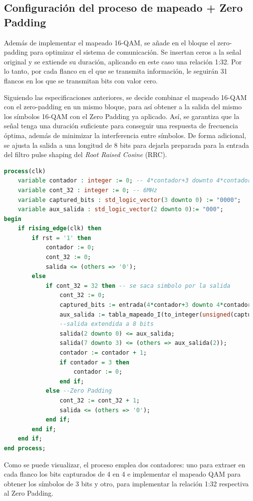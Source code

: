 \subsection{Configuración del proceso de mapeado + Zero Padding}

Además de implementar el mapeado 16-QAM, se añade en el bloque el zero-padding para optimizar el sistema de comunicación. Se insertan ceros a la señal original y se extiende su duración, aplicando en este caso una relación 1:32. Por lo tanto, por cada flanco en el que se transmita información, le seguirán 31 flancos en los que se transmitan bits con valor cero.

Siguiendo las especificaciones anteriores, se decide combinar el mapeado 16-QAM con el zero-padding en un mismo bloque, para así obtener a la salida del mismo los símbolos 16-QAM con el Zero Padding ya aplicado. Así, se garantiza que la señal tenga una duración suficiente para conseguir una respuesta de frecuencia óptima, además de minimizar la interferencia entre símbolos. De forma adicional, se ajusta la salida a una longitud de 8 bits para dejarla preparada para la entrada del filtro pulse shaping del \textit{Root Raised Cosine} (RRC). 

\vspace{3mm}

\begin{lstlisting}[language=VHDL, style=mystyle, caption={Proceso de mapeado (Camino I) + Zero Padding}]
process(clk) 
	variable contador : integer := 0; -- 4*contador+3 downto 4*contador
	variable cont_32 : integer := 0; -- 6MHz
	variable captured_bits : std_logic_vector(3 downto 0) := "0000";
	variable aux_salida : std_logic_vector(2 downto 0):= "000";
begin
	if rising_edge(clk) then
		if rst = '1' then
			contador := 0; 
			cont_32 := 0; 
			salida <= (others => '0'); 
		else
			if cont_32 = 32 then -- se saca simbolo por la salida
				cont_32 := 0;
				captured_bits := entrada(4*contador+3 downto 4*contador);
				aux_salida := tabla_mapeado_I(to_integer(unsigned(captured_bits))); 
				--salida extendida a 8 bits
				salida(2 downto 0) <= aux_salida; 
				salida(7 downto 3) <= (others => aux_salida(2));
				contador := contador + 1; 
				if contador = 3 then 
					contador := 0; 
				end if;
			else --Zero Padding
				cont_32 := cont_32 + 1;
				salida <= (others => '0');
			end if;
		end if;
	end if;         
end process; 
\end{lstlisting}

\pagebreak

Como se puede visualizar, el proceso emplea dos contadores: uno para extraer en cada flanco los bits capturados de 4 en 4 e implementar el mapeado QAM para obtener los símbolos de 3 bits y otro, para implementar la relación 1:32 respectiva al Zero Padding.


